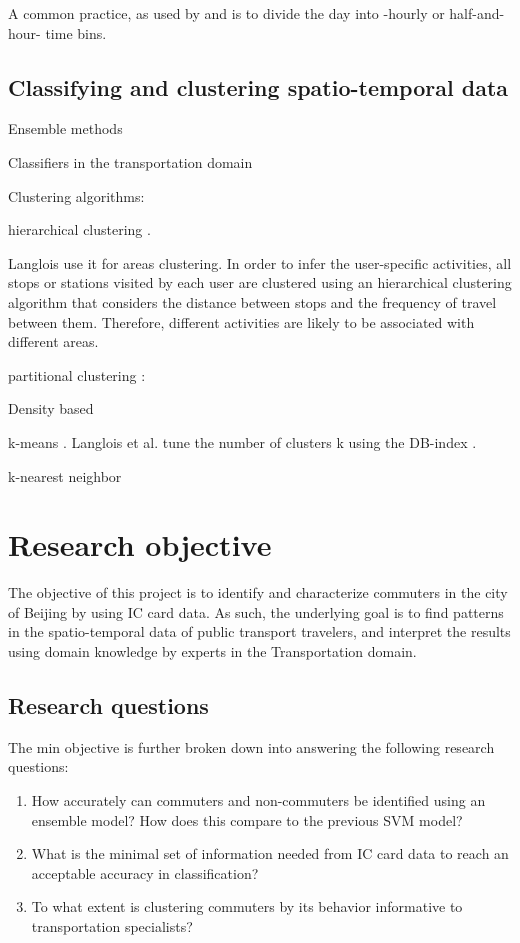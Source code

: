 \documentclass{article}
\begin{document}
A common practice, as used by \cite{ma2017understanding} and \cite{langlois2016inferring} is to divide the day into -hourly or half-and-hour- time bins.

\subsection{Classifying and clustering spatio-temporal data}
Ensemble methods

Classifiers in the transportation domain

Clustering algorithms: 

hierarchical clustering \cite{ortega2013classification}. 

Langlois use it for areas clustering. In order to infer the user-specific activities, all stops or stations visited by each user are clustered using an hierarchical clustering algorithm that considers the distance between stops and the frequency of travel between them. Therefore, different activities are likely to be associated with different areas.  \cite{langlois2016inferring}

partitional clustering \cite{ortega2013classification}:


Density based \cite{bhaskar2015passenger}

k-means \cite{morency2007measuring}. Langlois et al. tune the number of clusters k using the DB-index \cite{langlois2016inferring}. 

k-nearest neighbor \cite{ortega2013classification}


\newpage
\section{Research objective}
The objective of this project is to identify and characterize commuters in the city of Beijing by using IC card data. As such, the underlying goal is to find patterns in the spatio-temporal data of public transport travelers, and interpret the results using domain knowledge by experts in the Transportation domain.  

\subsection{Research questions}
The min objective is further broken down into answering the following research questions: 

\begin{enumerate}
\item How accurately can commuters and non-commuters be identified using an ensemble model? How does this compare to the previous SVM model?
\item What is the minimal set of information needed from IC card data to reach an acceptable accuracy in classification?
\item To what extent is clustering commuters by its behavior informative to transportation specialists? 
\end{enumerate}
\end{document}

